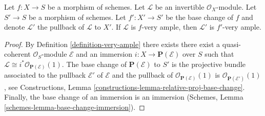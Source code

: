 \begin{lemma}
\label{lemma-very-ample-base-change}
Let $f : X \to S$ be a morphism of schemes.
Let $\mathcal{L}$ be an invertible $\mathcal{O}_X$-module.
Let $S' \to S$ be a morphism of schemes.
Let $f' : X' \to S'$ be the base change of $f$ and denote
$\mathcal{L}'$ the pullback of $\mathcal{L}$ to $X'$.
If $\mathcal{L}$ is $f$-very ample, then $\mathcal{L}'$ is $f'$-very ample.
\end{lemma}

\begin{proof}
By Definition \ref{definition-very-ample} there exists there exist a
quasi-coherent $\mathcal{O}_S$-module $\mathcal{E}$ and an immersion
$i : X \to \mathbf{P}(\mathcal{E})$ over $S$ such that
$\mathcal{L} \cong i^*\mathcal{O}_{\mathbf{P}(\mathcal{E})}(1)$.
The base change of $\mathbf{P}(\mathcal{E})$ to $S'$ is
the projective bundle associated to the pullback $\mathcal{E}'$
of $\mathcal{E}$ and the pullback of
$\mathcal{O}_{\mathbf{P}(\mathcal{E})}(1)$
is
$\mathcal{O}_{\mathbf{P}(\mathcal{E}')}(1)$, see
Constructions, Lemma \ref{constructions-lemma-relative-proj-base-change}.
Finally, the base change
of an immersion is an immersion
(Schemes, Lemma \ref{schemes-lemma-base-change-immersion}).
\end{proof}








